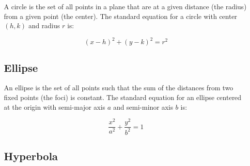 A circle is the set of all points in a plane that are at a given
distance (the radius) from a given point (the center). The standard
equation for a circle with center $(h,k)$ and radius $r$ is:

\begin{equation}
(x - h)^2 + (y - k)^2 = r^2
\end{equation}

\begin{center}
  
\end{center}


\subsection{Ellipse}

An ellipse is the set of all points such that the sum of the distances
from two fixed points (the foci) is constant. The standard equation
for an ellipse centered at the origin with semi-major axis $a$ and
semi-minor axis $b$ is:

\begin{equation}
\frac{x^2}{a^2} + \frac{y^2}{b^2} = 1
\end{equation}

\begin{center}
\end{center}
\subsection{Hyperbola}

